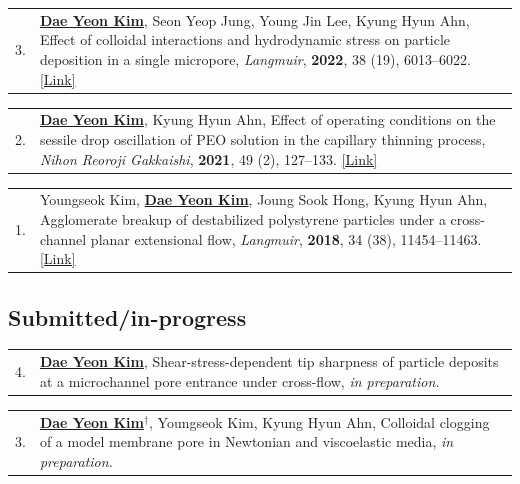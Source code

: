 \documentclass[11pt, a4paper]{article}
\makeatletter
\newenvironment{pubitem}[2]{%
  \begin{tabularx}{\textwidth}{@{}p{1cm}X@{}}
  #1 & #2 \\
  \end{tabularx}
}{}
\makeatother
\begin{document}
    \begin{pubitem}{3.}{\textbf{\underline{Dae Yeon Kim}}, Seon Yeop Jung, Young Jin Lee, Kyung Hyun Ahn, 
    Effect of colloidal interactions and hydrodynamic stress on particle deposition in a single micropore, 
    \textit{Langmuir}, \textbf{2022}, 38 (19), 6013--6022. \href{https://pubs.acs.org/doi/10.1021/acs.langmuir.2c00237}{[Link]}}
    \end{pubitem}
    
    \vspace{0.3em}
    
    \begin{pubitem}{2.}{\textbf{\underline{Dae Yeon Kim}}, Kyung Hyun Ahn, 
    Effect of operating conditions on the sessile drop oscillation of PEO solution in the capillary thinning process, 
    \textit{Nihon Reoroji Gakkaishi}, \textbf{2021}, 49 (2), 127--133. \href{https://www.jstage.jst.go.jp/article/rheology/49/2/49_127/_article}{[Link]}}
    \end{pubitem}
    
    \vspace{0.3em}
    
    \begin{pubitem}{1.}{Youngseok Kim, \textbf{\underline{Dae Yeon Kim}}, Joung Sook Hong, Kyung Hyun Ahn, 
    Agglomerate breakup of destabilized polystyrene particles under a cross-channel planar extensional flow, 
    \textit{Langmuir}, \textbf{2018}, 34 (38), 11454--11463. \href{https://pubs.acs.org/doi/10.1021/acs.langmuir.8b01958}{[Link]}}
    \end{pubitem}
    


    \subsection{Submitted/in-progress}


    \begin{pubitem}{4.}{\textbf{\underline{Dae Yeon Kim}},
    Shear-stress-dependent tip sharpness of particle deposits at a microchannel pore entrance under cross-flow, \textit{in preparation.}}
    \end{pubitem}

    \vspace{0.3em}

    \begin{pubitem}{3.}{\textbf{\underline{Dae Yeon Kim\ensuremath{^{\dagger}}}}, Youngseok Kim, Kyung Hyun Ahn,
    Colloidal clogging of a model membrane pore in Newtonian and viscoelastic media, \textit{in preparation.}}
    \end{pubitem}
\end{document}
